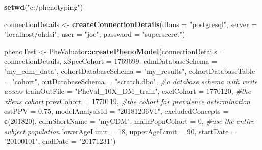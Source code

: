 \documentclass[]{article}
\newenvironment{Shaded}{\begin{snugshade}}{\end{snugshade}}
\newcommand{\CommentTok}[1]{\textcolor[rgb]{0.56,0.35,0.01}{\textit{#1}}}
\newcommand{\DataTypeTok}[1]{\textcolor[rgb]{0.13,0.29,0.53}{#1}}
\newcommand{\DecValTok}[1]{\textcolor[rgb]{0.00,0.00,0.81}{#1}}
\newcommand{\FloatTok}[1]{\textcolor[rgb]{0.00,0.00,0.81}{#1}}
\newcommand{\KeywordTok}[1]{\textcolor[rgb]{0.13,0.29,0.53}{\textbf{#1}}}
\newcommand{\NormalTok}[1]{#1}
\newcommand{\OperatorTok}[1]{\textcolor[rgb]{0.81,0.36,0.00}{\textbf{#1}}}
\newcommand{\StringTok}[1]{\textcolor[rgb]{0.31,0.60,0.02}{#1}}
\begin{document}
\begin{Shaded}
\begin{Highlighting}[]
\KeywordTok{setwd}\NormalTok{(}\StringTok{"c:/phenotyping"}\NormalTok{)}

\NormalTok{connectionDetails <-}\StringTok{ }\KeywordTok{createConnectionDetails}\NormalTok{(}\DataTypeTok{dbms =} \StringTok{"postgresql"}\NormalTok{,}
                                              \DataTypeTok{server =} \StringTok{"localhost/ohdsi"}\NormalTok{,}
                                              \DataTypeTok{user =} \StringTok{"joe"}\NormalTok{,}
                                              \DataTypeTok{password =} \StringTok{"supersecret"}\NormalTok{)}

\NormalTok{phenoTest <-}\StringTok{ }\NormalTok{PheValuator}\OperatorTok{::}\KeywordTok{createPhenoModel}\NormalTok{(}\DataTypeTok{connectionDetails =}\NormalTok{ connectionDetails,}
                           \DataTypeTok{xSpecCohort =} \DecValTok{1769699}\NormalTok{,}
                           \DataTypeTok{cdmDatabaseSchema =} \StringTok{"my_cdm_data"}\NormalTok{,}
                           \DataTypeTok{cohortDatabaseSchema =} \StringTok{"my_results"}\NormalTok{,}
                           \DataTypeTok{cohortDatabaseTable =} \StringTok{"cohort"}\NormalTok{,}
                           \DataTypeTok{outDatabaseSchema =} \StringTok{"scratch.dbo"}\NormalTok{, }\CommentTok{#a database schema with write access}
                           \DataTypeTok{trainOutFile =} \StringTok{"PheVal_10X_DM_train"}\NormalTok{,}
                           \DataTypeTok{exclCohort =} \DecValTok{1770120}\NormalTok{, }\CommentTok{#the xSens cohort}
                           \DataTypeTok{prevCohort =} \DecValTok{1770119}\NormalTok{, }\CommentTok{#the cohort for prevalence determination}
                           \DataTypeTok{estPPV =} \FloatTok{0.75}\NormalTok{,}
                           \DataTypeTok{modelAnalysisId =} \StringTok{"20181206V1"}\NormalTok{, }
                           \DataTypeTok{excludedConcepts =} \KeywordTok{c}\NormalTok{(}\DecValTok{201820}\NormalTok{), }
                           \DataTypeTok{cdmShortName =} \StringTok{"myCDM"}\NormalTok{, }
                           \DataTypeTok{mainPopnCohort =} \DecValTok{0}\NormalTok{, }\CommentTok{#use the entire subject population}
                           \DataTypeTok{lowerAgeLimit =} \DecValTok{18}\NormalTok{, }
                           \DataTypeTok{upperAgeLimit =} \DecValTok{90}\NormalTok{,}
                           \DataTypeTok{startDate =} \StringTok{"20100101"}\NormalTok{,}
                           \DataTypeTok{endDate =} \StringTok{"20171231"}\NormalTok{)}
\end{Highlighting}
\end{Shaded}
\end{document}
